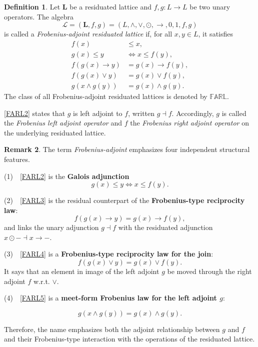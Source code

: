 \documentclass[final,12pt,times]{elsarticle}
\theoremstyle{plain}
\theoremstyle{definition}
\newtheorem{definition}{Definition}[section]
\newtheorem{remark}[definition]{Remark}
\theoremstyle{break}
\newcommand{\FARL}{\mathbb{FARL}}
\begin{document}
\begin{definition}\label{def:FARL}
Let
$\mathbf{L}$ be a residuated lattice and
$f,g:L\to L$ be two unary operators.  The algebra
\[
 \mathscr{L}=
 (\mathbf{L},f,g) =(L,\wedge,\vee,\odot,\to,0,1,f,g)
\]
is called a \emph{Frobenius-adjoint residuated lattice} if, for all
$x,y\in L$, it satisfies
\begin{align}
 f(x)&\le x,
   \tag{FARL1}\label{FARL1}\\
 g(x)\le y&\Longleftrightarrow x\le f(y),
   \tag{FARL2}\label{FARL2}\\
 f(g(x)\to y)&=g(x)\to f(y),
   \tag{FARL3}\label{FARL3}\\
 f(g(x)\vee y)&=g(x)\vee f(y),
   \tag{FARL4}\label{FARL4}\\
 g(x\wedge g(y))&=g(x)\wedge g(y).
   \tag{FARL5}\label{FARL5}
\end{align}
The class of all Frobenius-adjoint residuated lattices is denoted by
$\FARL$.
\end{definition}

 \eqref{FARL2} states that $g$ is left adjoint to $f$, written
$g\dashv f$.  Accordingly, $g$ is called the \emph{Frobenius left adjoint operator} and
$f$ the \emph{Frobenius right adjoint operator} on the underlying residuated lattice.

\begin{remark}\label{rem:FARL-terminology}
The term \emph{Frobenius-adjoint} emphasizes four independent structural
features.  

(1)~~\eqref{FARL2} is the {\bf Galois adjunction}
\[
 g(x)\le y\Longleftrightarrow x\le f(y).
\]

(2)~~\eqref{FARL3} is the residual counterpart of the {\bf Frobenius-type reciprocity law}:
\[
 f(g(x)\to y)=g(x)\to f(y),
\]
and links the unary adjunction $g\dashv f$ with the residuated adjunction
$x\odot{-}\dashv x\to{-}$. 

(3)~~\eqref{FARL4} is a {\bf Frobenius-type reciprocity law for the join}:
\[
 f(g(x)\vee y)=g(x)\vee f(y).
\]
It says that an element in image of the left adjoint $g$ be moved
through the right adjoint $f$ w.r.t. $\vee$.  

(4)~~\eqref{FARL5} is a {\bf meet-form Frobenius law for the left adjoint $g$}:

\[g(x\wedge g(y))=g(x)\wedge g(y).
\]

Therefore, the name emphasizes both the adjoint relationship between $g$ and $f$ and their Frobenius-type interaction with the operations of the residuated lattice. 
\end{remark}
\end{document}
